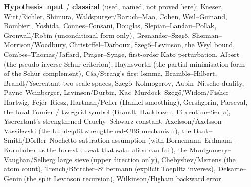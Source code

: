 \documentclass[11pt,a4paper]{article}
\begin{document}
\begin{keybox}
\textbf{Hypothesis input / classical} (used, named, not proved here): Kneser, Witt/Eichler, Shimura,
Waldspurger/Baruch--Mao, Cohen, Weil--Guinand, Bombieri, Yoshida, Connes--Consani, Douglas,
Slepian--Landau--Pollak, Gronwall/Robin (unconditional form only), Grenander--Szeg\H{o},
Sherman--Morrison/Woodbury, Christoffel--Darboux, Szeg\H{o}--Levinson, the Weyl bound,
Combes--Thomas/Jaffard, Prager--Synge, first-order Kato perturbation, Albert (the pseudo-inverse
Schur criterion), Haynsworth (the partial-minimisation form of the Schur complement),
C\'ea/Strang's first lemma, Bramble--Hilbert, Brandt/Yserentant two-scale spaces,
Szeg\H{o}--Kolmogorov, Aubin--Nitsche duality, Payne--Weinberger, Levinson/Durbin,
Kac--Murdock--Szeg\H{o}/Widom/Fisher--Hartwig, Fej\'er--Riesz, Hartman/Peller (Hankel
smoothing), Gershgorin, Parseval, the local Fourier / two-grid
symbol (Brandt, Hackbusch, Fiorentino--Serra), Yserentant's strengthened Cauchy--Schwarz
constant, Axelsson/Axelsson--Vassilevski (the band-split strengthened-CBS mechanism), the
Bank--Smith/D\"orfler--Nochetto saturation assumption (with
Bornemann--Erdmann--Kornhuber as the honest caveat that saturation can fail), the
Montgomery--Vaughan/Selberg large sieve (upper direction only), Chebyshev/Mertens (the atom
count), Trench/B\"ottcher--Silbermann (explicit Toeplitz inverses), Delsarte--Genin (the split
Levinson recursion), Wilkinson/Higham backward error.
\end{keybox}
\end{document}
